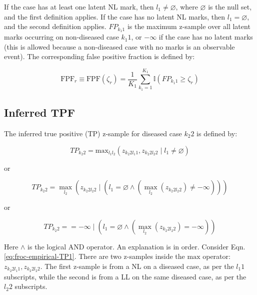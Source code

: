 \documentclass[
]{book}
\begin{document}
If the case has at least one latent NL mark, then \(l_1 \neq \varnothing\), where \(\varnothing\) is the null set, and the first definition applies. If the case has no latent NL marks, then \(l_1 = \varnothing\), and the second definition applies. \(FP_{k_1 1}\) is the maximum z-sample over all latent marks occurring on non-diseased case \(k_1 1\), or \(-\infty\) if the case has no latent marks (this is allowed because a non-diseased case with no marks is an observable event). The corresponding false positive fraction is defined by:

\begin{equation}
\text{FPF}_r \equiv \text{FPF} \left ( \zeta_r \right ) = \frac{1}{K_1} \sum_{k_1=1}^{K_1} \mathbb{I} \left ( FP_{k_1 1} \geq \zeta_r\right )
\label{eq:froc-empirical-FPF}
\end{equation}

\hypertarget{inferred-tpf}{%
\subsection{Inferred TPF}\label{inferred-tpf}}

The inferred true positive (TP) z-sample for diseased case \(k_2 2\) is defined by:

\begin{equation}
TP_{k_2 2} = \text{max}_{l_1 l_2}\left ( z_{k_2 2 l_1 1} ,z_{k_2 2 l_2 2} \mid l_1 \neq \varnothing \right )
\label{eq:froc-empirical-TP1}
\end{equation}

or

\begin{equation}
TP_{k_2 2} = \textstyle\max_{l_2}  \left ( z_{k_2 2 l_2 2} \mid\left ( l_1 = \varnothing \land \left (\textstyle\max_{l_2}{\left (z_{k_2 2 l_2 2}  \right )} \neq -\infty  \right )  \right ) \right ) 
\label{eq:froc-empirical-TP2}
\end{equation}

or

\begin{equation}
TP_{k_2 2} = = -\infty \mid \left ( l_1 = \varnothing \land\left ( \textstyle\max_{l_2}{\left (z_{k_2 2 l_2 2}  \right )} = -\infty  \right )  \right )
\label{eq:froc-empirical-TP3}
\end{equation}

Here \(\land\) is the logical AND operator. An explanation is in order. Consider Eqn. \eqref{eq:froc-empirical-TP1}. There are two z-samples inside the \(\text{max}\) operator: \(z_{k_2 2 l_1 1} ,z_{k_2 2 l_2 2}\). The first z-sample is from a NL on a diseased case, as per the \(l_1 1\) subscripts, while the second is from a LL on the same diseased case, as per the \(l_2 2\) subscripts.
\end{document}
